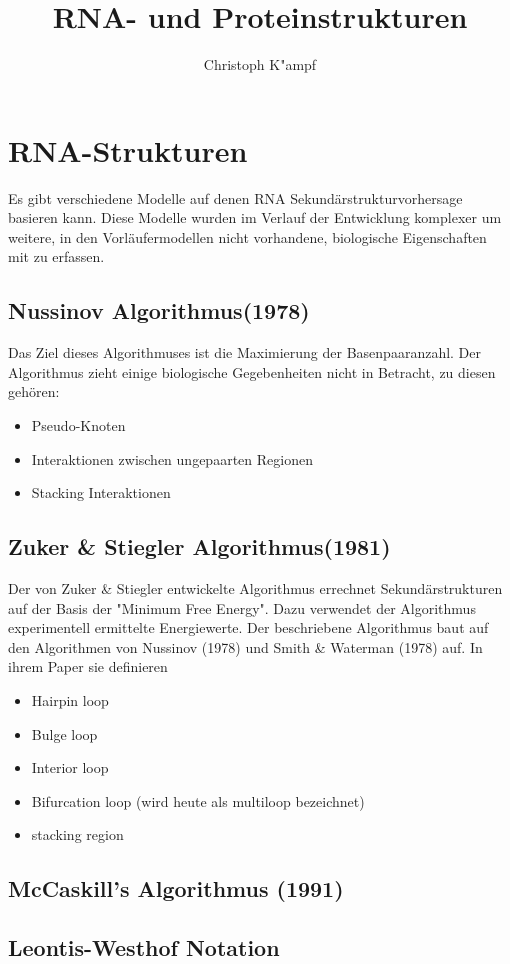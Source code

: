 \documentclass
[
   draft,     %
   paper=a4,%
   paper=portrait, %
   pagesize=auto, %
   fontsize=11pt,%
   abstract=true, %
   titlepage=true %
 ]
 {scrartcl}
\author{Christoph K"ampf}
\title{RNA- und Proteinstrukturen}
\begin{document}
\section{RNA-Strukturen}
Es gibt verschiedene Modelle auf denen RNA Sekundärstrukturvorhersage basieren kann. Diese Modelle wurden im Verlauf der Entwicklung komplexer um weitere, in den Vorläufermodellen nicht vorhandene, biologische Eigenschaften mit zu erfassen.

\subsection{Nussinov Algorithmus(1978)}
Das Ziel dieses Algorithmuses ist die Maximierung der Basenpaaranzahl. Der Algorithmus zieht einige biologische Gegebenheiten nicht in Betracht, zu diesen gehören:
\begin{itemize}
\item Pseudo-Knoten
\item Interaktionen zwischen ungepaarten Regionen
\item Stacking Interaktionen
\end{itemize}

\subsection{Zuker \& Stiegler Algorithmus(1981)}
Der von Zuker \& Stiegler entwickelte Algorithmus errechnet Sekundärstrukturen auf der Basis der "Minimum Free Energy". Dazu verwendet der Algorithmus experimentell ermittelte Energiewerte. Der beschriebene Algorithmus baut auf den Algorithmen von Nussinov (1978) und Smith \& Waterman (1978) auf. In ihrem Paper sie definieren 
\begin{itemize}
\item Hairpin loop
\item Bulge loop
\item Interior loop
\item Bifurcation loop (wird heute als multiloop bezeichnet)
\item stacking region 
\end{itemize}

\subsection{McCaskill's Algorithmus (1991)}


\subsection{Leontis-Westhof Notation}
\end{document}
